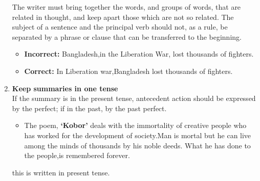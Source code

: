 \documentclass{report}
\begin{document}
\begin{enumerate}
	The writer must bring together the words, and groups of words, that are related
	in thought, and keep apart those which are not so related.
	The subject of a sentence and the principal verb should not, as a rule, be
	separated by a phrase or clause that can be transferred to the beginning.
	\begin{itemize}
		\item \textbf{Incorrect: }Bangladesh,in the Liberation War, lost thousands of fighters.
		\item \textbf{Correct:} In Liberation war,Bangladesh lost thousands of fighters.
	\end{itemize}
	\item \textbf{Keep summaries in one tense}\\
	If the summary is in the present tense, antecedent action should be expressed by the perfect; if in the past, by the past perfect.
	\begin{itemize}
		\item The poem, \textbf{‘Kobor’} deals with the immortality of creative people who has worked
		for the development of society.Man is mortal but he can live among the
		minds of thousands by his noble deeds. What he has done to the people,is
		remembered forever.
	\end{itemize}

this is written in present tense.
\end{enumerate}
\end{document}
